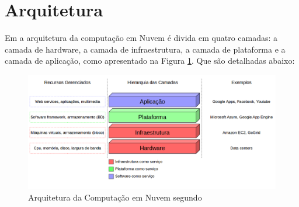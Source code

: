 \section{Arquitetura} \label{cloud:arch}

Em \citep{stateOfArt:2010} a arquitetura da computação em Nuvem é divida em quatro camadas: a camada de hardware, a camada de infraestrutura, a camada de plataforma e a camada de aplicação, como apresentado na Figura \ref{architecture1}. Que são detalhadas abaixo:

\begin{figure}[htbp]
  \centering \includegraphics[scale=.4]{imgs/architecture1.png}
\caption{Arquitetura da Computação em Nuvem segundo \citep{stateOfArt:2010}} 
\label{architecture1}
\end{figure}

